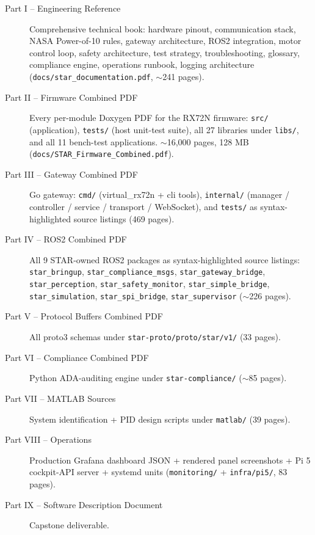 \documentclass[11pt,letterpaper]{article}
\begin{document}
\begin{description}
\item[Part I -- Engineering Reference] Comprehensive technical book:
hardware pinout, communication stack, NASA Power-of-10 rules, gateway
architecture, ROS2 integration, motor control loop, safety architecture,
test strategy, troubleshooting, glossary, compliance engine, operations
runbook, logging architecture (\texttt{docs/star\_documentation.pdf},
$\sim$241 pages).

\item[Part II -- Firmware Combined PDF] Every per-module Doxygen PDF for
the RX72N firmware: \texttt{src/} (application), \texttt{tests/} (host
unit-test suite), all 27 libraries under \texttt{libs/}, and all 11
bench-test applications. $\sim$16,000 pages, 128 MB
(\texttt{docs/STAR\_Firmware\_Combined.pdf}).

\item[Part III -- Gateway Combined PDF] Go gateway: \texttt{cmd/}
(virtual\_rx72n + cli tools), \texttt{internal/} (manager / controller /
service / transport / WebSocket), and \texttt{tests/} as syntax-highlighted
source listings (469 pages).

\item[Part IV -- ROS2 Combined PDF] All 9 STAR-owned ROS2 packages as
syntax-highlighted source listings: \texttt{star\_bringup},
\texttt{star\_compliance\_msgs}, \texttt{star\_gateway\_bridge},
\texttt{star\_perception}, \texttt{star\_safety\_monitor},
\texttt{star\_simple\_bridge}, \texttt{star\_simulation},
\texttt{star\_spi\_bridge}, \texttt{star\_supervisor} ($\sim$226 pages).

\item[Part V -- Protocol Buffers Combined PDF] All proto3 schemas under
\texttt{star-proto/proto/star/v1/} (33 pages).

\item[Part VI -- Compliance Combined PDF] Python ADA-auditing engine
under \texttt{star-compliance/} ($\sim$85 pages).

\item[Part VII -- MATLAB Sources] System identification + PID design
scripts under \texttt{matlab/} (39 pages).

\item[Part VIII -- Operations] Production Grafana dashboard JSON +
rendered panel screenshots + Pi 5 cockpit-API server + systemd units
(\texttt{monitoring/} + \texttt{infra/pi5/}, 83 pages).

\item[Part IX -- Software Description Document] Capstone deliverable.


\end{description}
\end{document}
